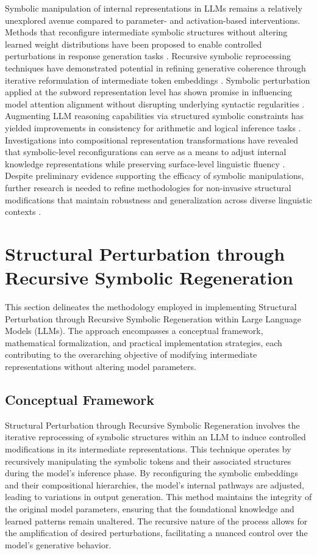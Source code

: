 \documentclass[5p,times]{elsarticle}
\begin{document}
Symbolic manipulation of internal representations in LLMs remains a relatively unexplored avenue compared to parameter- and activation-based interventions. Methods that reconfigure intermediate symbolic structures without altering learned weight distributions have been proposed to enable controlled perturbations in response generation tasks \cite{shofman2024negative}. Recursive symbolic reprocessing techniques have demonstrated potential in refining generative coherence through iterative reformulation of intermediate token embeddings \cite{slaten2024probabilistic}. Symbolic perturbation applied at the subword representation level has shown promise in influencing model attention alignment without disrupting underlying syntactic regularities \cite{anderson2024semantic}. Augmenting LLM reasoning capabilities via structured symbolic constraints has yielded improvements in consistency for arithmetic and logical inference tasks \cite{hawthorne2024enhancing}. Investigations into compositional representation transformations have revealed that symbolic-level reconfigurations can serve as a means to adjust internal knowledge representations while preserving surface-level linguistic fluency \cite{zhang2024unified}. Despite preliminary evidence supporting the efficacy of symbolic manipulations, further research is needed to refine methodologies for non-invasive structural modifications that maintain robustness and generalization across diverse linguistic contexts \cite{davies2024boosting}. 


\section{Structural Perturbation through Recursive Symbolic Regeneration}

This section delineates the methodology employed in implementing Structural Perturbation through Recursive Symbolic Regeneration within Large Language Models (LLMs). The approach encompasses a conceptual framework, mathematical formalization, and practical implementation strategies, each contributing to the overarching objective of modifying intermediate representations without altering model parameters.

\subsection{Conceptual Framework}

Structural Perturbation through Recursive Symbolic Regeneration involves the iterative reprocessing of symbolic structures within an LLM to induce controlled modifications in its intermediate representations. This technique operates by recursively manipulating the symbolic tokens and their associated structures during the model's inference phase. By reconfiguring the symbolic embeddings and their compositional hierarchies, the model's internal pathways are adjusted, leading to variations in output generation. This method maintains the integrity of the original model parameters, ensuring that the foundational knowledge and learned patterns remain unaltered. The recursive nature of the process allows for the amplification of desired perturbations, facilitating a nuanced control over the model's generative behavior.
\end{document}
